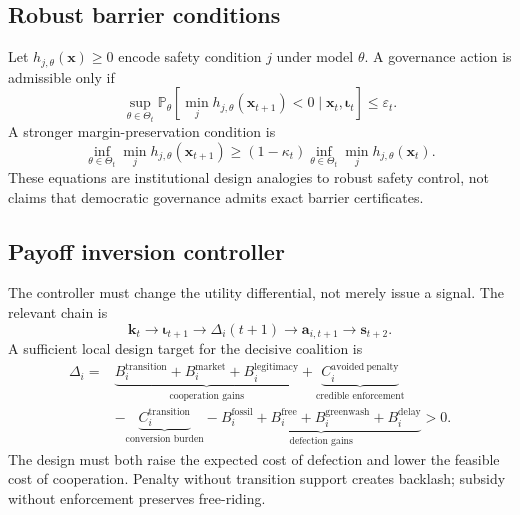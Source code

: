 \documentclass[11pt,a4paper]{article}
\numberwithin{equation}{section}
\theoremstyle{definition}
\theoremstyle{plain}
\theoremstyle{remark}
\newcommand{\Pp}{\mathbb{P}}
\newcommand{\state}{\bm{x}}
\newcommand{\kpi}{\bm{k}}
\newcommand{\action}{\bm{a}}
\newcommand{\inst}{\bm{\iota}}
\begin{document}
\subsection{Robust barrier conditions}

Let $h_{j,\theta}(\state)\ge0$ encode safety condition $j$ under model $\theta$. A governance action is admissible only if
\begin{equation}
\sup_{\theta\in\Theta_t}
\Pp_{\theta}
\left[
\min_j h_{j,\theta}(\state_{t+1})<0
\mid\state_t,\inst_t
\right]
\le\varepsilon_t.
\label{eq:barrierchance}
\end{equation}
A stronger margin-preservation condition is
\begin{equation}
\inf_{\theta\in\Theta_t}\min_j h_{j,\theta}(\state_{t+1})
\ge
(1-\kappa_t)
\inf_{\theta\in\Theta_t}\min_j h_{j,\theta}(\state_t).
\label{eq:barriermargin}
\end{equation}
These equations are institutional design analogies to robust safety control, not claims that democratic governance admits exact barrier certificates.

\subsection{Payoff inversion controller}

The controller must change the utility differential, not merely issue a signal. The relevant chain is
\begin{equation}
\kpi_t\longrightarrow\inst_{t+1}\longrightarrow\Delta_i(t+1)
\longrightarrow\action_{i,t+1}\longrightarrow\bm{s}_{t+2}.
\label{eq:controlchain}
\end{equation}
A sufficient local design target for the decisive coalition is
\begin{equation}
\begin{aligned}
\Delta_i={}&
\underbrace{B_i^{\mathrm{transition}}+B_i^{\mathrm{market}}+B_i^{\mathrm{legitimacy}}}_{\text{cooperation gains}}
+
\underbrace{C_i^{\mathrm{avoided\ penalty}}}_{\text{credible enforcement}}
\\[-0.15em]
&-
\underbrace{C_i^{\mathrm{transition}}}_{\text{conversion burden}}
-
\underbrace{B_i^{\mathrm{fossil}}+B_i^{\mathrm{free}}+B_i^{\mathrm{greenwash}}+B_i^{\mathrm{delay}}}_{\text{defection gains}}
>0.
\end{aligned}
\label{eq:inversioncondition}
\end{equation}
The design must both raise the expected cost of defection and lower the feasible cost of cooperation. Penalty without transition support creates backlash; subsidy without enforcement preserves free-riding.
\end{document}
